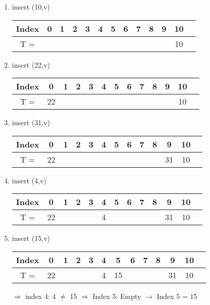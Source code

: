 \begin{enumerate}
\item insert (10,v)

\begin{center}
\begin{tabular}{|c|c|c|c|c|c|c|c|c|c|c|c|c|}
\hline
Index & 0 & 1 & 2 & 3 & 4 & 5 & 6 & 7 & 8 & 9 & 10\\
\hline
T = & & & & & & & & & & & 10\\
\hline
\end{tabular}
\end{center}

\item insert (22,v)

\begin{center}
\begin{tabular}{|c|c|c|c|c|c|c|c|c|c|c|c|c|}
\hline
Index & 0 & 1 & 2 & 3 & 4 & 5 & 6 & 7 & 8 & 9 & 10\\
\hline
T = & 22 & & & & & & & & & & 10\\
\hline
\end{tabular}
\end{center}

\item insert (31,v)

\begin{center}
\begin{tabular}{|c|c|c|c|c|c|c|c|c|c|c|c|c|}
\hline
Index & 0 & 1 & 2 & 3 & 4 & 5 & 6 & 7 & 8 & 9 & 10\\
\hline
T = & 22 & & & & & & & & & 31 & 10\\
\hline
\end{tabular}
\end{center}

\item insert (4,v)

\begin{center}
\begin{tabular}{|c|c|c|c|c|c|c|c|c|c|c|c|c|}
\hline
Index & 0 & 1 & 2 & 3 & 4 & 5 & 6 & 7 & 8 & 9 & 10\\
\hline
T = & 22 & & & & 4 & & & & & 31 & 10\\
\hline
\end{tabular}
\end{center}

\item insert (15,v)

\begin{center}
\begin{tabular}{|c|c|c|c|c|c|c|c|c|c|c|c|c|}
\hline
Index & 0 & 1 & 2 & 3 & 4 & 5 & 6 & 7 & 8 & 9 & 10\\
\hline
T = & 22 & & & & 4 & 15 & & & & 31 & 10\\
\hline
\end{tabular}
\end{center}
$\Rightarrow$ index 4: 4 $\neq$ 15 $\Rightarrow$ Index 5: Empty $\rightarrow$ Index 5 = 15


\end{enumerate}
